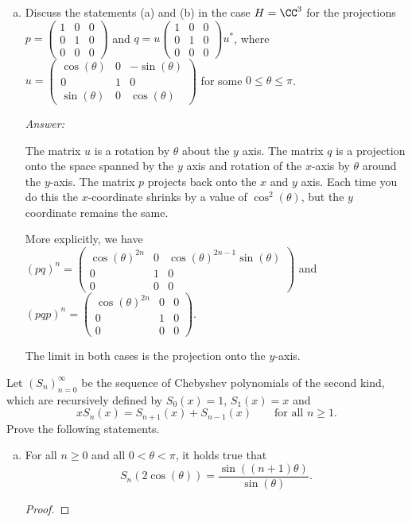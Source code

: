 \documentclass{article}
\begin{document}
\begin{enumerate}[(a)]
  \item Discuss the statements (a) and (b) in the case $H = \CC^3$ for the projections
    $p = \begin{pmatrix} 1 & 0 & 0 \\ 0 & 1 & 0 \\ 0 & 0 & 0   \end{pmatrix}$
    and $q = u  \begin{pmatrix} 1 & 0 & 0 \\ 0 & 1 & 0 \\ 0 & 0 & 0   \end{pmatrix} u^*$, where $u = \begin{pmatrix} \cos(\theta) & 0 & -\sin(\theta) \\    0 & 1 & 0 \\      \sin(\theta) & 0 & \cos(\theta)     \end{pmatrix}$ for some
    $0 \le \theta \le \pi$.

    \emph{Answer:}
    
    The matrix $u$ is a rotation by $\theta$ about the $y$ axis. The matrix $q$ is a projection onto the space spanned by the $y$ axis and rotation of the $x$-axis by $\theta$ around the $y$-axis.  The matrix $p$ projects back onto the $x$ and $y$ axis.  Each time you do this the $x$-coordinate shrinks by a value of $\cos^2(\theta)$, but the $y$ coordinate remains the same.

    More explicitly, we have
    $(pq)^n = \begin{pmatrix} \cos(\theta)^{2n} & 0 & \cos(\theta)^{2n-1} \sin(\theta) \\ 0 & 1 & 0 \\ 0 & 0 & 0     \end{pmatrix}$ and
    $(pqp)^n = \begin{pmatrix} \cos(\theta)^{2n} & 0 & 0 \\ 0 & 1 & 0 \\ 0 & 0 & 0     \end{pmatrix}$.

    The limit in both cases is the projection onto the $y$-axis.

  \end{enumerate}
    
   Let $(S_n)_{n=0}^\infty$ be the sequence of Chebyshev polynomials of the second kind, which are recursively defined by $S_0(x) = 1$, $S_1(x) = x$ and
  $$x S_n(x) = S_{n+1}(x) + S_{n-1}(x) \qquad \text{for all } n \ge 1.$$
  Prove the following statements.
  \begin{enumerate}[(a)]
  \item  For all $n \ge 0$ and all $0 < \theta < \pi$, it holds true that
    $$S_n( 2 \cos(\theta)) = \frac{\sin((n+1) \theta)}{\sin(\theta)}.$$
    \begin{proof}
    \end{proof}
    
  \end{enumerate}
  
\end{document}
